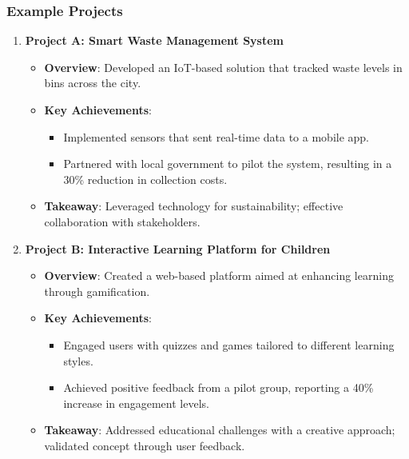 \documentclass[aspectratio=169]{beamer}
\begin{document}
\begin{frame}[fragile]
    \frametitle{Example Projects}
    \begin{enumerate}
        \item \textbf{Project A: Smart Waste Management System}
            \begin{itemize}
                \item \textbf{Overview}: Developed an IoT-based solution that tracked waste levels in bins across the city.
                \item \textbf{Key Achievements}:
                    \begin{itemize}
                        \item Implemented sensors that sent real-time data to a mobile app.
                        \item Partnered with local government to pilot the system, resulting in a 30\% reduction in collection costs.
                    \end{itemize}
                \item \textbf{Takeaway}: Leveraged technology for sustainability; effective collaboration with stakeholders.
            \end{itemize}

        \item \textbf{Project B: Interactive Learning Platform for Children}
            \begin{itemize}
                \item \textbf{Overview}: Created a web-based platform aimed at enhancing learning through gamification.
                \item \textbf{Key Achievements}:
                    \begin{itemize}
                        \item Engaged users with quizzes and games tailored to different learning styles.
                        \item Achieved positive feedback from a pilot group, reporting a 40\% increase in engagement levels.
                    \end{itemize}
                \item \textbf{Takeaway}: Addressed educational challenges with a creative approach; validated concept through user feedback.
            \end{itemize}
        

\end{enumerate}
\end{frame}
\end{document}
